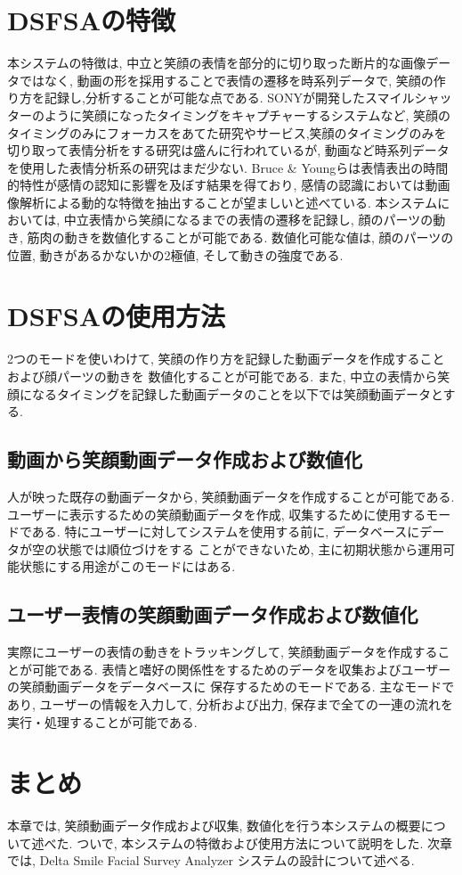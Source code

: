 \section{DSFSAの特徴}
本システムの特徴は, 中立と笑顔の表情を部分的に切り取った断片的な画像データではなく,
動画の形を採用することで表情の遷移を時系列データで, 笑顔の作り方を記録し,分析することが可能な点である.
SONYが開発したスマイルシャッターのように笑顔になったタイミングをキャプチャーするシステムなど,
笑顔のタイミングのみにフォーカスをあてた研究やサービス,笑顔のタイミングのみを切り取って表情分析をする研究は盛んに行われているが,
動画など時系列データを使用した表情分析系の研究はまだ少ない.
Bruce \& Youngらは表情表出の時間的特性が感情の認知に影響を及ぼす結果を得ており\cite{kokada},
感情の認識においては動画像解析による動的な特徴を抽出することが望ましいと述べている\cite{yukitakahashi}.
本システムにおいては, 中立表情から笑顔になるまでの表情の遷移を記録し,
顔のパーツの動き, 筋肉の動きを数値化することが可能である.
数値化可能な値は, 顔のパーツの位置, 動きがあるかないかの2極値, そして動きの強度である.

\section{DSFSAの使用方法}
2つのモードを使いわけて, 笑顔の作り方を記録した動画データを作成することおよび顔パーツの動きを
数値化することが可能である.
また, 中立の表情から笑顔になるタイミングを記録した動画データのことを以下では笑顔動画データとする.
\subsection{動画から笑顔動画データ作成および数値化}
人が映った既存の動画データから, 笑顔動画データを作成することが可能である.
ユーザーに表示するための笑顔動画データを作成, 収集するために使用するモードである.
特にユーザーに対してシステムを使用する前に, データベースにデータが空の状態では順位づけをする
ことができないため, 主に初期状態から運用可能状態にする用途がこのモードにはある.
\subsection{ユーザー表情の笑顔動画データ作成および数値化}
実際にユーザーの表情の動きをトラッキングして, 笑顔動画データを作成することが可能である.
表情と嗜好の関係性をするためのデータを収集およびユーザーの笑顔動画データをデータベースに
保存するためのモードである.
主なモードであり, ユーザーの情報を入力して, 分析および出力, 保存まで全ての一連の流れを
実行・処理することが可能である.

\section{まとめ}
本章では, 笑顔動画データ作成および収集, 数値化を行う本システムの概要について述べた.
ついで, 本システムの特徴および使用方法について説明をした.
次章では, Delta Smile Facial Survey Analyzer システムの設計について述べる.

